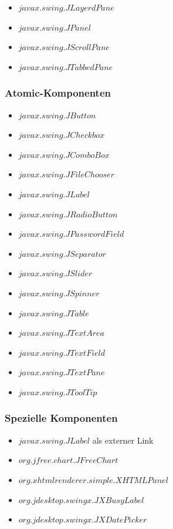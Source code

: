   \begin{itemize}
    \item \(javax.swing.JLayerdPane\)
    \item \(javax.swing.JPanel\)
    \item \(javax.swing.JScrollPane\)
    \item \(javax.swing.JTabbedPane\)
  \end{itemize}
  
  \subsubsection{Atomic-Komponenten}
  \begin{itemize}
    \item \(javax.swing.JButton\)
    \item \(javax.swing.JCheckbox\)
    \item \(javax.swing.JComboBox\)
    \item \(javax.swing.JFileChooser\)
    \item \(javax.swing.JLabel\)
    \item \(javax.swing.JRadioButton\)
    \item \(javax.swing.JPasswordField\)
    \item \(javax.swing.JSeparator\)
    \item \(javax.swing.JSlider\)
    \item \(javax.swing.JSpinner\)
    \item \(javax.swing.JTable\)
    \item \(javax.swing.JTextArea\)
    \item \(javax.swing.JTextField\)
    \item \(javax.swing.JTextPane\)
    \item \(javax.swing.JToolTip\)
  \end{itemize}
  
  \subsubsection{Spezielle Komponenten}
    
  \begin{itemize}
    \item \(javax.swing.JLabel\) als externer Link
    \item \(org.jfree.chart.JFreeChart\)
    \item \(org.xhtmlrenderer.simple.XHTMLPanel\)
    \item \(org.jdesktop.swingx.JXBusyLabel\)
    \item \(org.jdesktop.swingx.JXDatePicker\)
  \end{itemize}
    
